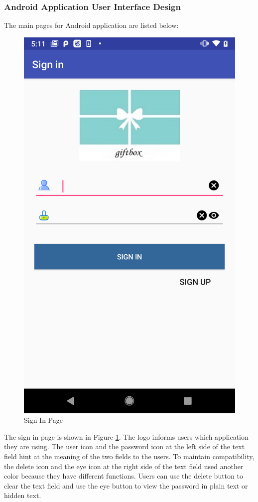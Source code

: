 \subsubsection{Android Application User Interface Design}
\par The main pages for Android application are listed below:
\begin{figure}[htb]
\centering
\includegraphics[width=.4\textwidth]{section03/assets/SignIn.png}
\caption[Sign In Page]{\label{SignInUI}Sign In Page}
\end{figure}
\par The sign in page is shown in Figure \ref{SignInUI}. The logo informs users which application they are using. The user icon and the password icon at the left side of the text field hint at the meaning of the two fields to the users. To maintain compatibility, the delete icon and the eye icon at the right side of the text field used another color because they have different functions. Users can use the delete button to clear the text field and use the eye button to view the password in plain text or hidden text.

